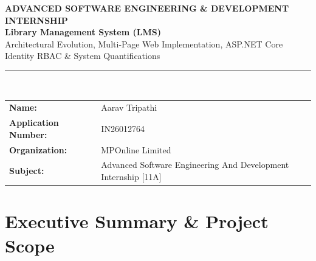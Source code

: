 \documentclass[11pt,a4paper]{report}
\begin{document}
\thispagestyle{empty}

\begin{center}
    \vspace*{30pt}
    {\large \textbf{\color{darkgray} ADVANCED SOFTWARE ENGINEERING \& DEVELOPMENT INTERNSHIP}}\\[20pt]
    
    {\fontsize{28}{34}\selectfont \textbf{\color{navyblue} Library Management System (LMS)}}\\[18pt]
    
    {\Large \color{accentgold} Architectural Evolution, Multi-Page Web Implementation, ASP.NET Core Identity RBAC \& System Quantifications}\\[25pt]
    
    {\color{accentgold}\rule{0.6\textwidth}{3pt}}\\[50pt]
    
    \vfill
    
    {\renewcommand{\arraystretch}{1.4}%
    \begin{tabular}{>{\raggedleft\arraybackslash}p{5.5cm} >{\raggedright\arraybackslash}p{9.0cm}}
        \textbf{Name:} & Aarav Tripathi \\
        \textbf{Application Number:} & IN26012764 \\
        \textbf{Organization:} & MPOnline Limited \\
        \textbf{Subject:} & Advanced Software Engineering And Development Internship [11A] \\
    \end{tabular}}
    \vspace*{30pt}
\end{center}

\newpage
{}
\tableofcontents
\newpage

\setcounter{page}{3}

\chapter{Executive Summary \& Project Scope}
\end{document}
